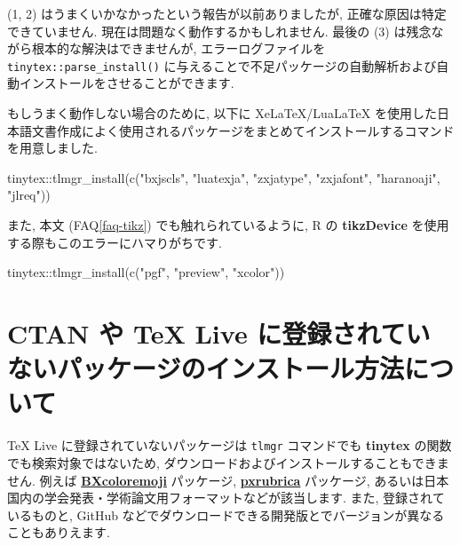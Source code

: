 \documentclass[
  xelatex,ja=standard,jafont=noto]{bxjsreport}
\newenvironment{Shaded}{\begin{snugshade}}{\end{snugshade}}
\newcommand{\FunctionTok}[1]{\textcolor[rgb]{0.00,0.00,0.00}{#1}}
\newcommand{\NormalTok}[1]{#1}
\newcommand{\SpecialCharTok}[1]{\textcolor[rgb]{0.00,0.00,0.00}{#1}}
\newcommand{\StringTok}[1]{\textcolor[rgb]{0.31,0.60,0.02}{#1}}
\begin{document}
(1, 2) はうまくいかなかったという報告が以前ありましたが,
正確な原因は特定できていません. 現在は問題なく動作するかもしれません.
最後の (3) は残念ながら根本的な解決はできませんが, エラーログファイルを
\texttt{tinytex::parse\_install()}
に与えることで不足パッケージの自動解析および自動インストールをさせることができます.

もしうまく動作しない場合のために, 以下に XeLaTeX/LuaLaTeX
を使用した日本語文書作成によく使用されるパッケージをまとめてインストールするコマンドを用意しました.

\begin{Shaded}
\begin{Highlighting}[numbers=left,,]
\NormalTok{tinytex}\SpecialCharTok{::}\FunctionTok{tlmgr\_install}\NormalTok{(}\FunctionTok{c}\NormalTok{(}\StringTok{"bxjscls"}\NormalTok{, }\StringTok{"luatexja"}\NormalTok{, }\StringTok{"zxjatype"}\NormalTok{, }\StringTok{"zxjafont"}\NormalTok{, }\StringTok{"haranoaji"}\NormalTok{, }\StringTok{"jlreq"}\NormalTok{))}
\end{Highlighting}
\end{Shaded}

また, 本文 (FAQ\ref{faq-tikz}) でも触れられているように, R の
\textbf{tikzDevice} を使用する際もこのエラーにハマりがちです.

\begin{Shaded}
\begin{Highlighting}[numbers=left,,]
\NormalTok{tinytex}\SpecialCharTok{::}\FunctionTok{tlmgr\_install}\NormalTok{(}\FunctionTok{c}\NormalTok{(}\StringTok{"pgf"}\NormalTok{, }\StringTok{"preview"}\NormalTok{, }\StringTok{"xcolor"}\NormalTok{))}
\end{Highlighting}
\end{Shaded}

\hypertarget{ctan-ux3084-tex-live-ux306bux767bux9332ux3055ux308cux3066ux3044ux306aux3044ux30d1ux30c3ux30b1ux30fcux30b8ux306eux30a4ux30f3ux30b9ux30c8ux30fcux30ebux65b9ux6cd5ux306bux3064ux3044ux3066}{%
\section{CTAN や TeX Live
に登録されていないパッケージのインストール方法について}\label{ctan-ux3084-tex-live-ux306bux767bux9332ux3055ux308cux3066ux3044ux306aux3044ux30d1ux30c3ux30b1ux30fcux30b8ux306eux30a4ux30f3ux30b9ux30c8ux30fcux30ebux65b9ux6cd5ux306bux3064ux3044ux3066}}

TeX Live に登録されていないパッケージは \texttt{tlmgr} コマンドでも
\textbf{tinytex} の関数でも検索対象ではないため,
ダウンロードおよびインストールすることもできません. 例えば
\href{https://github.com/zr-tex8r/BXcoloremoji}{\textbf{BXcoloremoji}}
パッケージ,
\href{https://github.com/zr-tex8r/PXrubrica}{\textbf{pxrubrica}}
パッケージ,
あるいは日本国内の学会発表・学術論文用フォーマットなどが該当します.
また, 登録されているものと, GitHub
などでダウンロードできる開発版とでバージョンが異なることもありえます.
\end{document}

